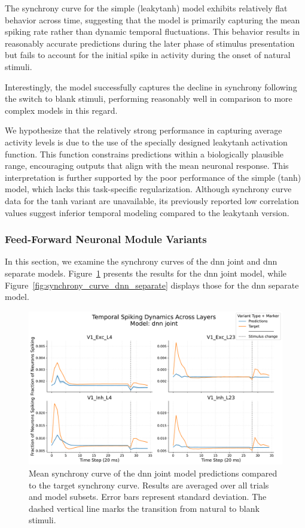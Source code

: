 The synchrony curve for the simple (leakytanh) model exhibits relatively flat behavior across time, suggesting that the model is primarily capturing the mean spiking rate rather than dynamic temporal fluctuations. This behavior results in reasonably accurate predictions during the later phase of stimulus presentation but fails to account for the initial spike in activity during the onset of natural stimuli.

Interestingly, the model successfully captures the decline in synchrony following the switch to blank stimuli, performing reasonably well in comparison to more complex models in this regard.

We hypothesize that the relatively strong performance in capturing average activity levels is due to the use of the specially designed leakytanh activation function. This function constrains predictions within a biologically plausible range, encouraging outputs that align with the mean neuronal response. This interpretation is further supported by the poor performance of the simple (tanh) model, which lacks this task-specific regularization. Although synchrony curve data for the tanh variant are unavailable, its previously reported low correlation values suggest inferior temporal modeling compared to the leakytanh version.


\subsubsection{Feed-Forward Neuronal Module Variants}
\label{{subsubsec:dnn_eval}}
In this section, we examine the synchrony curves of the dnn joint and dnn separate models. Figure~\ref{fig:synchrony_curve_dnn_joint} presents the results for the dnn joint model, while Figure~\ref{fig:synchrony_curve_dnn_separate} displays those for the dnn separate model.
\begin{figure}
    \centering
    \includegraphics[width=\linewidth]{img/plots/separate_model_synchrony_curve_dnn_joint_evaluation.pdf}
    \caption{Mean synchrony curve of the dnn joint model predictions compared to the target synchrony curve. Results are averaged over all trials and model subsets. Error bars represent standard deviation. The dashed vertical line marks the transition from natural to blank stimuli.}
    \label{fig:synchrony_curve_dnn_joint}
\end{figure}

